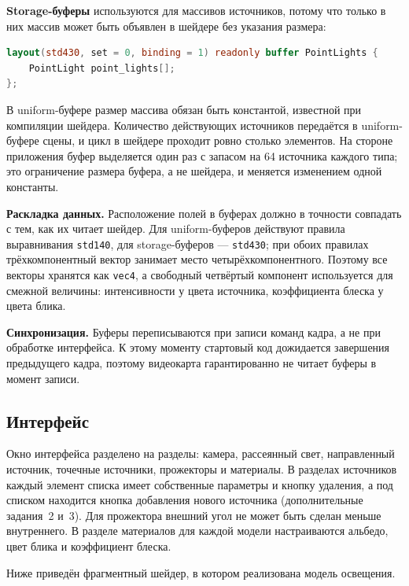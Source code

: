 \documentclass[14pt,a4paper]{extarticle}
\begin{document}
\textbf{Storage-буферы} используются для массивов источников, потому что
только в них массив может быть объявлен в шейдере без указания размера:

\begin{lstlisting}[language=GLSL, numbers=none]
layout(std430, set = 0, binding = 1) readonly buffer PointLights {
	PointLight point_lights[];
};
\end{lstlisting}

В uniform-буфере размер массива обязан быть константой, известной при
компиляции шейдера. Количество действующих источников передаётся в
uniform-буфере сцены, и цикл в шейдере проходит ровно столько элементов. На
стороне приложения буфер выделяется один раз с запасом на 64 источника каждого
типа; это ограничение размера буфера, а не шейдера, и меняется изменением одной
константы.

\textbf{Раскладка данных.} Расположение полей в буферах должно в точности
совпадать с тем, как их читает шейдер. Для uniform-буферов действуют правила
выравнивания \texttt{std140}, для storage-буферов — \texttt{std430}; при
обоих правилах трёхкомпонентный вектор занимает место четырёхкомпонентного.
Поэтому все векторы хранятся как \texttt{vec4}, а свободный четвёртый
компонент используется для смежной величины: интенсивности у цвета источника,
коэффициента блеска у цвета блика.

\textbf{Синхронизация.} Буферы переписываются при записи команд кадра, а не при
обработке интерфейса. К этому моменту стартовый код дожидается завершения
предыдущего кадра, поэтому видеокарта гарантированно не читает буферы в момент
записи.

\subsection{Интерфейс}

Окно интерфейса разделено на разделы: камера, рассеянный свет, направленный
источник, точечные источники, прожекторы и материалы. В разделах источников
каждый элемент списка имеет собственные параметры и кнопку удаления, а под
списком находится кнопка добавления нового источника (дополнительные
задания~2 и~3). Для прожектора внешний угол не может быть сделан меньше
внутреннего. В разделе материалов для каждой модели настраиваются альбедо,
цвет блика и коэффициент блеска.

Ниже приведён фрагментный шейдер, в котором реализована модель освещения.


\end{document}
